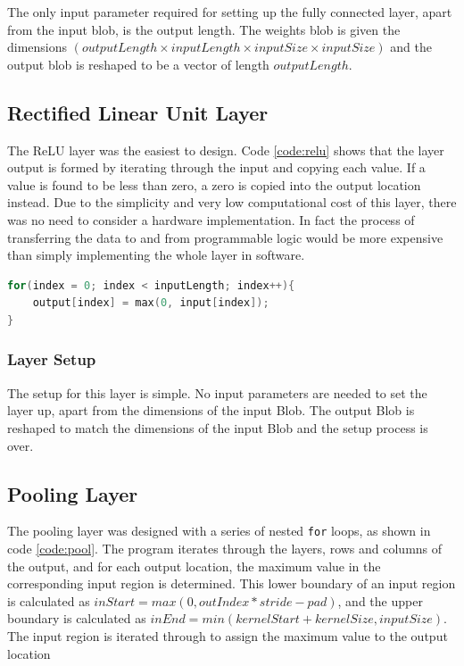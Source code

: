 \documentclass[12pt]{article}
\begin{document}
The only input parameter required for setting up the fully connected layer, apart from the input blob, is the output length. The weights blob is given the dimensions $(outputLength \times inputLength \times inputSize \times inputSize)$ and the output blob is reshaped to be a vector of length $outputLength$. 

\subsection{Rectified Linear Unit Layer}
\label{sec:Design-Relu}

The ReLU layer was the easiest to design. Code \ref{code:relu} shows that the layer output is formed by iterating through the input and copying each value. If a value is found to be less than zero, a zero is copied into the output location instead. Due to the simplicity and very low computational cost of this layer, there was no need to consider a hardware implementation. In fact the process of transferring the data to and from programmable logic would be more expensive than simply implementing the whole layer in software. 

\renewcommand{\lstlistingname}{Code}
\begin{lstlisting}[caption=ReLU layer computation, label=code:relu, language=C, float=ht]
for(index = 0; index < inputLength; index++){
	output[index] = max(0, input[index]);
}
\end{lstlisting} 

\subsubsection{Layer Setup}
\label{sec:Design-Relu-Setup}

The setup for this layer is simple. No input parameters are needed to set the layer up, apart from the dimensions of the input Blob. The output Blob is reshaped to match the dimensions of the input Blob and the setup process is over.

\subsection{Pooling Layer}
\label{sec:Design-Pool}

The pooling layer was designed with a series of nested \lstinline|for| loops, as shown in code \ref{code:pool}. The program iterates through the layers, rows and columns of the output, and for each output location, the maximum value in the corresponding input region is determined. This lower boundary of an input region is calculated as $inStart = max(0, outIndex * stride - pad)$, and the upper boundary is calculated as $inEnd = min(kernelStart + kernelSize, inputSize)$. The input region is iterated through to assign the maximum value to the output location
\end{document}
